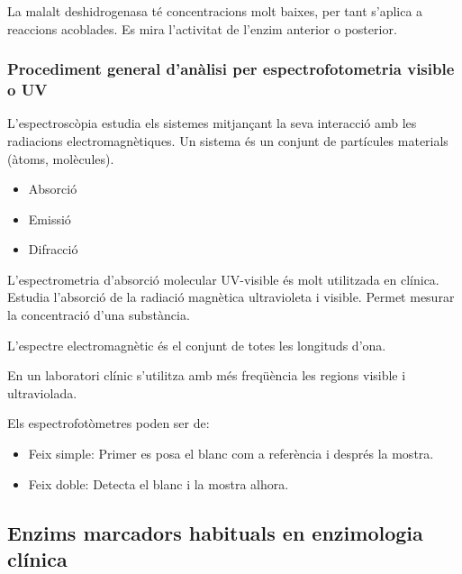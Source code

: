 La malalt deshidrogenasa té concentracions molt baixes, per tant
s'aplica a reaccions acoblades. Es mira l'activitat de l'enzim
anterior o posterior.


\subsubsection{Procediment general d'anàlisi per espectrofotometria
  visible o UV}
L'espectroscòpia estudia els sistemes mitjançant la seva interacció
amb les radiacions electromagnètiques. Un sistema és un conjunt de
partícules materials (àtoms, molècules).
\begin{itemize}
\item Absorció
\item Emissió
\item Difracció
\end{itemize}

L'espectrometria d'absorció molecular UV-visible és molt utilitzada en
clínica. Estudia l'absorció de la radiació magnètica ultravioleta i
visible. Permet mesurar la concentració d'una substància.

L'espectre electromagnètic és el conjunt de totes les longituds d'ona.

En un laboratori clínic s'utilitza amb més freqüència les regions
visible i ultraviolada.

Els espectrofotòmetres poden ser de:
\begin{itemize}
\item Feix simple: Primer es posa el blanc com a referència i després
  la mostra.
\item Feix doble: Detecta el blanc i la mostra alhora.
\end{itemize}

\subsection{Enzims marcadors habituals en enzimologia clínica}
